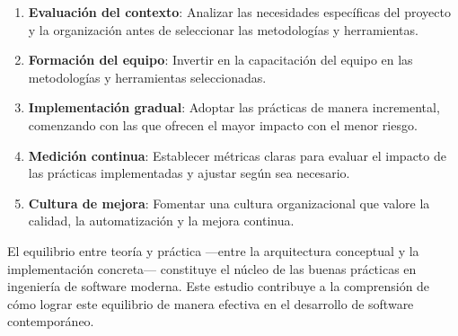 \begin{enumerate}
    \item \textbf{Evaluación del contexto}: Analizar las necesidades específicas del proyecto y la organización antes de seleccionar las metodologías y herramientas.
    
    \item \textbf{Formación del equipo}: Invertir en la capacitación del equipo en las metodologías y herramientas seleccionadas.
    
    \item \textbf{Implementación gradual}: Adoptar las prácticas de manera incremental, comenzando con las que ofrecen el mayor impacto con el menor riesgo.
    
    \item \textbf{Medición continua}: Establecer métricas claras para evaluar el impacto de las prácticas implementadas y ajustar según sea necesario.
    
    \item \textbf{Cultura de mejora}: Fomentar una cultura organizacional que valore la calidad, la automatización y la mejora continua.
\end{enumerate}

El equilibrio entre teoría y práctica —entre la arquitectura conceptual y la implementación concreta— constituye el núcleo de las buenas prácticas en ingeniería de software moderna. Este estudio contribuye a la comprensión de cómo lograr este equilibrio de manera efectiva en el desarrollo de software contemporáneo.